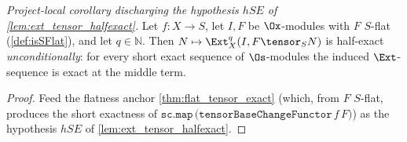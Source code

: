 \begin{lemma}

  \label{lem:ext_tensor_halfexact_of_flat}
  \textit{Project-local corollary discharging the hypothesis $hSE$ of
  \cref{lem:ext_tensor_halfexact}.}
  Let $f : X \to S$, let $I, F$ be $\Ox$-modules with $F$ $S$-flat
  (\cref{def:isSFlat}), and let $q \in \mathbb{N}$. Then $N \mapsto
  \Ext^q_X(I, F\tensor_S N)$ is half-exact \emph{unconditionally}: for every short
  exact sequence of $\Os$-modules the induced $\Ext$-sequence is exact at the middle
  term.
  \begin{proof}
    Feed the flatness anchor \cref{thm:flat_tensor_exact} (which, from $F$ $S$-flat,
    produces the short exactness of $\mathtt{sc.map\,(tensorBaseChangeFunctor}\,f\,F)$)
    as the hypothesis $hSE$ of \cref{lem:ext_tensor_halfexact}.
  \end{proof}
\end{lemma}

